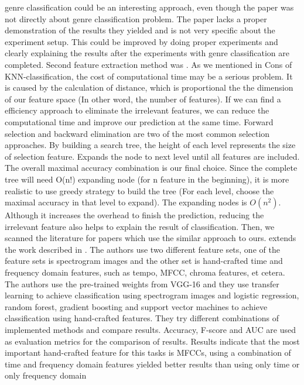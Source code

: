 \documentclass[acmtog, authorversion]{acmart}
\begin{document}
genre classification could be an interesting approach, even though the paper was not directly about genre classification problem. The paper lacks a proper 
demonstration of the results they yielded and is not very specific about the experiment setup. This could be improved by doing proper experiments and 
clearly explaining the results after the experiments with genre classification are completed.
Second feature extraction method was \cite{tang2014feature}. As we mentioned in Cons of KNN-classification, the cost of 
computational time may be a serious problem. It is caused by the calculation of distance, which is proportional the the dimension of our feature space 
(In other word, the number of features). If we can find a efficiency approach to eliminate the irrelevant features, we can reduce the computational time 
and improve our prediction at the same time. 
Forward selection and backward elimination are two of the most common selection approaches. By building a search tree, the height of each level represents 
the size of selection feature. Expands the node to next level until all features are included. The overall maximal accuracy combination is our final 
choice. Since the complete tree will need O(n!) expanding node (for n feature in the beginning), it is more realistic to use greedy strategy to build the 
tree (For each level, choose the maximal accuracy in that level to expand). The expanding nodes is $O(n^2)$. Although it increases the overhead to finish 
the prediction, reducing the irrelevant feature also helps to explain the result of classification. 
Then, we scanned the literature for papers which use the similar approach to ours. \cite{bahuleyan2018music} extends 
the work described in \cite{wyse2017audio}. The authors use two different feature sets, 
one of the feature sets is spectrogram images and the other set is hand-crafted time and frequency domain features, such as tempo, MFCC, chroma features, 
et cetera. The authors use the pre-trained weights from VGG-16 \cite{simonyan2014very} and they use transfer learning to achieve classification using spectrogram images and logistic regression, random forest, gradient boosting and 
support vector machines to achieve classification using hand-crafted features. They try different combinations of implemented methods and compare results.
 Accuracy, F-score and AUC are used as evaluation metrics for the comparison of results. Results indicate that the most important hand-crafted feature for
  this tasks is MFCCs, using a combination of time and frequency domain features yielded better results than using only time or only frequency domain 
\end{document}
